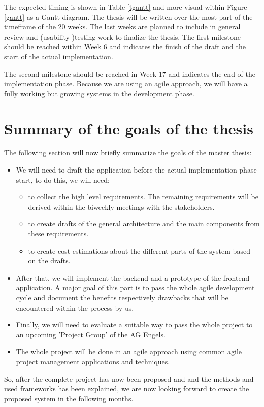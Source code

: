 \documentclass[a4page]{article}
\begin{document}
The expected timing is shown in Table \ref{tgantt} and more visual within Figure \ref{gantt} as a Gantt diagram. The thesis will be written over the most part of the timeframe of the 20 weeks. The last weeks are planned to include in general review and (usability-)testing work to finalize the thesis. The first milestone should be reached within Week 6 and indicates the finish of the draft and the start of the actual implementation. 

The second milestone should be reached in Week 17 and indicates the end of the implementation phase. Because we are using an agile approach, we will have a fully working but growing systems in the development phase. 

\section{Summary of the goals of the thesis}
The following section will now briefly summarize the goals of the master thesis:
\begin{itemize}
	\item We will need to draft the application before the actual implementation phase start, to do this, we will need:
	\begin{itemize}
	\item to collect the high level requirements. The remaining requirements will be derived within the biweekly meetings with the stakeholders.
	\item to create drafts of the general architecture and the main components from these requirements.
	\item to create cost estimations about the different parts of the system based on the drafts.
	\end{itemize} 
	\item After that, we will implement the backend and a prototype of the frontend application. A major goal of this part is to pass the whole agile development cycle and document the benefits respectively drawbacks that will be encountered within the process by us.	
	\item Finally, we will need to evaluate a suitable way to pass the whole project to an upcoming 'Project Group' of the AG Engels.  
	\item The whole project will be done in an agile approach using common agile project management  applications and techniques.
\end{itemize} 

So, after the complete project has now been proposed and and the methods and used frameworks has been explained, we are now looking forward to create the proposed system in the following months.
\end{document}
